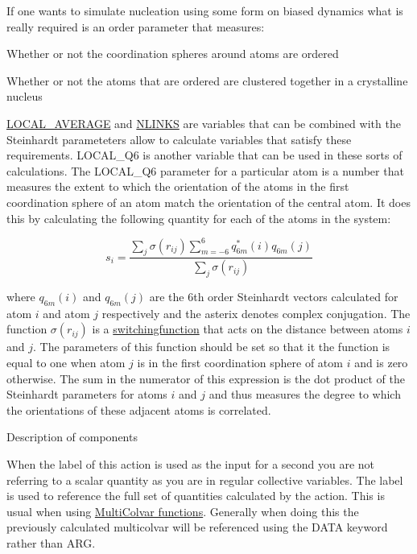 If one wants to simulate nucleation using some form on biased dynamics what is really required is an order parameter that measures\+:


\begin{DoxyItemize}
\item Whether or not the coordination spheres around atoms are ordered
\item Whether or not the atoms that are ordered are clustered together in a crystalline nucleus
\end{DoxyItemize}

\hyperlink{LOCAL_AVERAGE}{L\+O\+C\+A\+L\+\_\+\+A\+V\+E\+R\+A\+G\+E} and \hyperlink{NLINKS}{N\+L\+I\+N\+K\+S} are variables that can be combined with the Steinhardt parameteters allow to calculate variables that satisfy these requirements. L\+O\+C\+A\+L\+\_\+\+Q6 is another variable that can be used in these sorts of calculations. The L\+O\+C\+A\+L\+\_\+\+Q6 parameter for a particular atom is a number that measures the extent to which the orientation of the atoms in the first coordination sphere of an atom match the orientation of the central atom. It does this by calculating the following quantity for each of the atoms in the system\+:

\[ s_i = \frac{ \sum_j \sigma( r_{ij} ) \sum_{m=-6}^6 q_{6m}^{*}(i)q_{6m}(j) }{ \sum_j \sigma( r_{ij} ) } \]

where $q_{6m}(i)$ and $q_{6m}(j)$ are the 6th order Steinhardt vectors calculated for atom $i$ and atom $j$ respectively and the asterix denotes complex conjugation. The function $\sigma( r_{ij} )$ is a \hyperlink{switchingfunction}{switchingfunction} that acts on the distance between atoms $i$ and $j$. The parameters of this function should be set so that it the function is equal to one when atom $j$ is in the first coordination sphere of atom $i$ and is zero otherwise. The sum in the numerator of this expression is the dot product of the Steinhardt parameters for atoms $i$ and $j$ and thus measures the degree to which the orientations of these adjacent atoms is correlated.

\begin{DoxyParagraph}{Description of components}

\end{DoxyParagraph}
When the label of this action is used as the input for a second you are not referring to a scalar quantity as you are in regular collective variables. The label is used to reference the full set of quantities calculated by the action. This is usual when using \hyperlink{mcolv_multicolvarfunction}{Multi\+Colvar functions}. Generally when doing this the previously calculated multicolvar will be referenced using the D\+A\+T\+A keyword rather than A\+R\+G.

